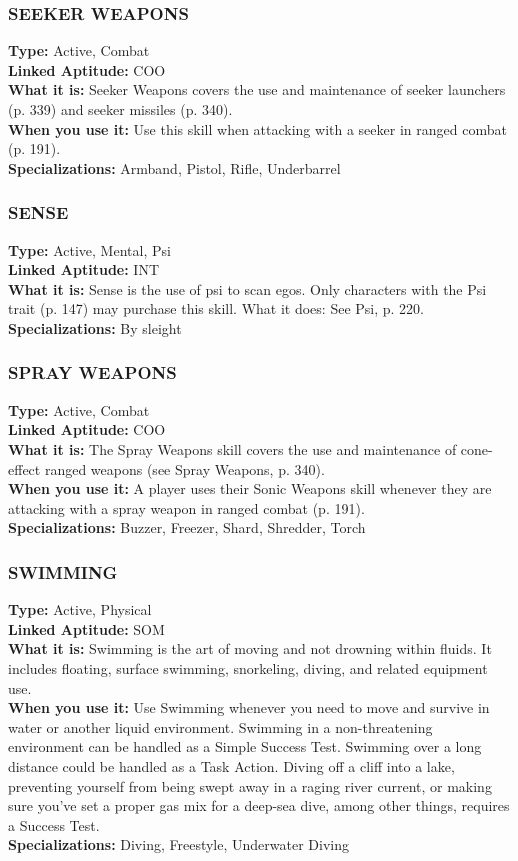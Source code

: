 \subsubsection{SEEKER WEAPONS} \textbf{Type:} Active, Combat \\ \textbf{Linked Aptitude:} COO \\ \textbf{What it is:} Seeker Weapons covers the use and maintenance of seeker launchers (p. 339) and seeker missiles (p. 340). \\ \textbf{When you use it:} Use this skill when attacking with a seeker in ranged combat (p. 191). \\ \textbf{Specializations:} Armband, Pistol, Rifle, Underbarrel 

\subsubsection{SENSE} \textbf{Type:} Active, Mental, Psi \\ \textbf{Linked Aptitude:} INT \\ \textbf{What it is:} Sense is the use of psi to scan egos. Only characters with the Psi trait (p. 147) may purchase this skill. What it does: See Psi, p. 220. \\ \textbf{Specializations:} By sleight 

\subsubsection{SPRAY WEAPONS} \textbf{Type:} Active, Combat \\ \textbf{Linked Aptitude:} COO \\ \textbf{What it is:} The Spray Weapons skill covers the use and maintenance of cone-effect ranged weapons (see Spray Weapons, p. 340). \\ \textbf{When you use it:} A player uses their Sonic Weapons skill whenever they are attacking with a spray weapon in ranged combat (p. 191). \\ \textbf{Specializations:} Buzzer, Freezer, Shard, Shredder, Torch 

\subsubsection{SWIMMING} \textbf{Type:} Active, Physical \\ \textbf{Linked Aptitude:} SOM \\ \textbf{What it is:} Swimming is the art of moving and not drowning within fluids. It includes floating, surface swimming, snorkeling, diving, and related equipment use. \\ \textbf{When you use it:} Use Swimming whenever you need to move and survive in water or another liquid environment. Swimming in a non-threatening environment can be handled as a Simple Success Test. Swimming over a long distance could be handled as a Task Action. Diving off a cliff into a lake, preventing yourself from being swept away in a raging river current, or making sure you’ve set a proper gas mix for a deep-sea dive, among other things, requires a Success Test. \\ \textbf{Specializations:} Diving, Freestyle, Underwater Diving 


